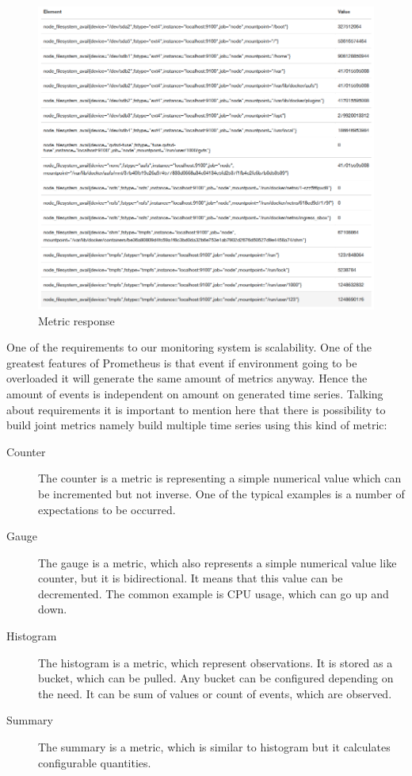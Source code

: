 \begin{figure}[htbp]
\begin{center}
  \includegraphics[width=\linewidth]{components/3/monitoring_req.png}
  \caption{Metric response}
  \label{fig:monitoring_req}
\end{center}
\end{figure}

One of the requirements to our monitoring system is scalability. One of the greatest features of Prometheus is that event if environment going to be overloaded it will generate the same amount of metrics anyway. Hence the amount of events is independent on amount on generated time series. 
Talking about requirements it is important to mention here that there is possibility to build joint metrics namely build multiple time series using this kind of metric:

\begin{description}
\item[Counter] The counter is a metric is representing a simple numerical value which can be incremented but not inverse. One of the typical examples is a number of expectations to be occurred. 
\item[Gauge] The gauge is a metric, which also represents a simple numerical value like counter, but it is bidirectional. It means that this value can be decremented. The common example is CPU usage, which can go up and down.
\item[Histogram] The histogram is a metric, which represent observations.  It is stored as a bucket, which can be pulled. Any bucket can be configured depending on the need. It can be sum of values or count of events, which are observed.
\item[Summary] The summary is a metric, which is similar to histogram but it calculates configurable quantities. 
\end{description}

